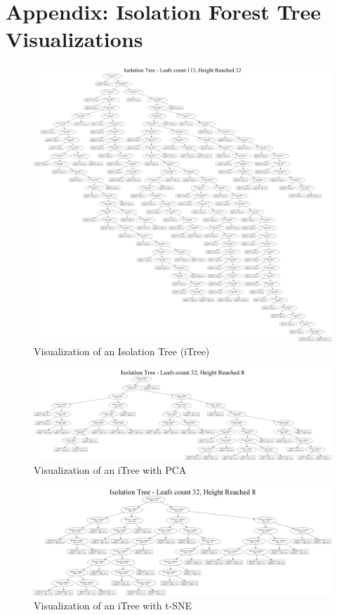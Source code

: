
\newpage
\onecolumn


\section{Appendix: Isolation Forest Tree Visualizations}

\begin{figure}[htbp]
\centering
\includegraphics[width=1\textwidth]{resources/images/itree_graph.png}
\caption{Visualization of an Isolation Tree (iTree)}
\label{fig:itree_appendix}
\end{figure}

\begin{figure}[htbp]
\centering
\includegraphics[width=1\textwidth]{resources/images/itree_pca_graph.png}
\caption{Visualization of an iTree with PCA}
\label{fig:pca_itree_appendix}
\end{figure}

\begin{figure}[htbp]
\centering
\includegraphics[width=1\textwidth]{resources/images/itree_tsne_graph.png}
\caption{Visualization of an iTree with t-SNE}
\label{fig:tsne_itree_appendix}
\end{figure}